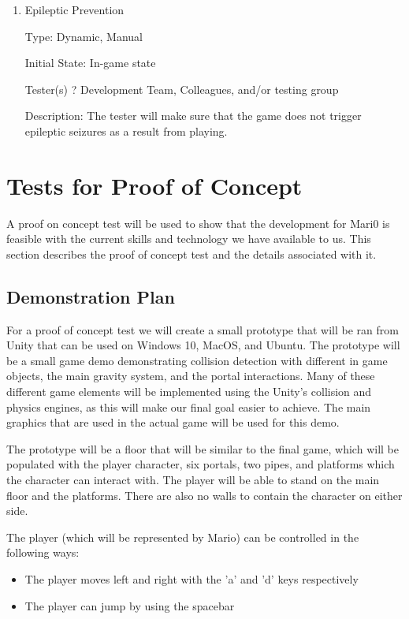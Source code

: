 \documentclass[12pt, titlepage]{article}
\begin{document}
\begin{enumerate}

\item{Epileptic Prevention\\}

Type: Dynamic, Manual

Initial State: In-game state

Tester(s) ? Development Team, Colleagues, and/or testing group

Description: The tester will make sure that the game does not trigger epileptic seizures as a result from playing.

\end{enumerate}

\section{Tests for Proof of Concept}

A proof on concept test will be used to show that the development for Mari0 is feasible with the current skills and technology we have available to us. This section describes the proof of concept test and the details associated with it.

\subsection{Demonstration Plan}
For a proof of concept test we will create a small prototype that will be ran from Unity that can be used on Windows 10, MacOS, and Ubuntu. The prototype will be a small game demo demonstrating collision detection with different in game objects, the main gravity system, and the portal interactions. Many of these different game elements will be implemented using the Unity's collision and physics engines, as this will make our final goal easier to achieve. The main  graphics that are used in the actual game will be used for this demo.

The prototype will be a floor that will be similar to the final game, which will be populated with the player character, six portals, two pipes, and platforms which the character can interact with. The player will be able to stand on the main floor and the platforms. There are also no walls to contain the character on either side.

The player (which will be represented by Mario) can be controlled in the following ways:
\begin{itemize}  
\item The player moves left and right with the 'a' and 'd' keys respectively
\item The player can jump by using the spacebar
\end{itemize}
\end{document}
